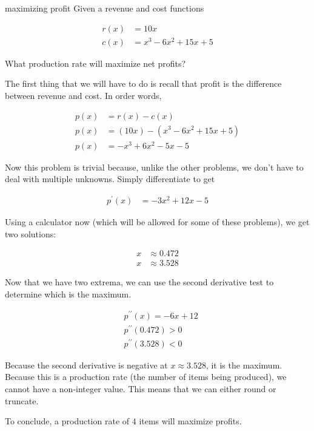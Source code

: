 \begin{examplebreak}{maximizing profit}
    Given a revenue and cost functions
    
    \begin{align*}
        r \left( x \right) &= 10x \\
        c \left( x \right) &= x^3 - 6x^2 + 15x + 5
    \end{align*}
    
    What production rate will maximize net profits?
    
    \vspace{0.3cm}
    
    The first thing that we will have to do is recall that profit is the difference between revenue and cost. In order words,
    
    \begin{align}
        p \left( x \right) &= r \left( x \right) - c \left( x \right) \\
        p \left( x \right) &= \left( 10x \right) - \left( x^3 - 6x^2 + 15x + 5 \right) \\
        p \left( x \right) &= -x^3 + 6x^2 - 5x - 5
    \end{align}
    
    Now this problem is trivial because, unlike the other problems, we don't have to deal with multiple unknowns. Simply differentiate to get
    
    \begin{align}
        p^\prime \left( x \right) &= -3x^2 + 12x - 5
    \end{align}
    
    Using a calculator now (which will be allowed for some of these problems), we get two solutions:
    
    \begin{align*}
        x &\approx 0.472 \\
        x & \approx 3.528
    \end{align*}
    
    Now that we have two extrema, we can use the second derivative test to determine which is the maximum.
    
    \begin{align}
        &p^{\prime \prime} \left( x \right) = -6x + 12 \\
        &p^{\prime \prime} \left( 0.472 \right) > 0 \\
        &p^{\prime \prime} \left( 3.528 \right) < 0
    \end{align}
    
    Because the second derivative is negative at \( x \approx 3.528 \), it is the maximum. Because this is a production rate (the number of items being produced), we cannot have a non-integer value. This means that we can either round or truncate.
    
    To conclude, a production rate of \( 4 \) items will maximize profits.
\end{examplebreak}

